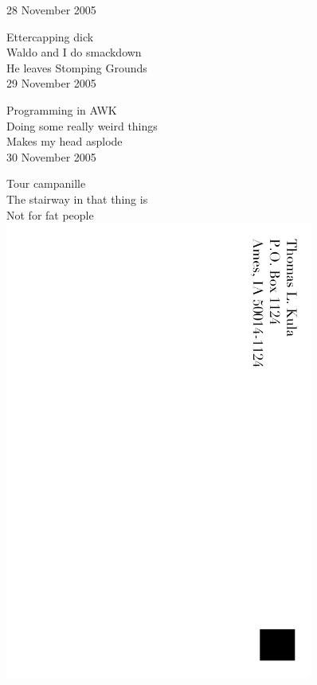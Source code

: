 \documentclass[12pt]{article}
\begin{document}
28 November 2005

Ettercapping dick \\
Waldo and I do smackdown \\
He leaves Stomping Grounds \\

29 November 2005

Programming in AWK \\
Doing some really weird things \\
Makes my head asplode \\

30 November 2005

Tour campanille \\
The stairway in that thing is \\
Not for fat people \\

\includegraphics[width=101mm]{backpage.png}
\end{document}
